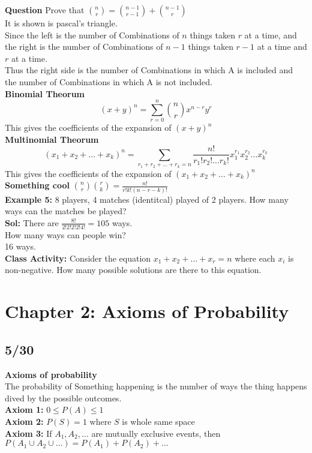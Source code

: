 \documentclass{article}
\begin{document}
\textbf{Question} Prove that $\binom{n}{r} = \binom{n-1}{r-1} + \binom{n-1}{r}$\\
It is shown is pascal's triangle.\\
Since the left is the number of Combinations of $n$ things taken $r$ at a time, and the right is the number of Combinations of $n-1$ things taken $r-1$ at a time and $r$ at a time.\\ 
Thus the right side is the number of Combinations in which A is included and the number of Combinations in which A is not included.\\

\textbf{Binomial Theorum}\\
$$ (x+y)^n = \sum_{r=0}^{n} \binom{n}{r} x^{n-r}y^r$$
This gives the coefficients of the expansion of $(x+y)^n$\\

\textbf{Multinomial Theorum}\\
$$ (x_1 + x_2 + \ldots + x_k)^n = \sum_{r_1 + r_2 + \ldots + r_k = n} \frac{n!}{r_1!r_2! \ldots r_k!} x_1^{r_1}x_2^{r_2} \ldots x_k^{r_k}$$
This gives the coefficients of the expansion of $(x_1 + x_2 + \ldots + x_k)^n$\\

\textbf{Something cool} $\binom{n}{r} \binom{r}{k} = \frac{n!}{r!k!(n-r-k)!}$\\

\textbf{Example 5:} 8 players, 4 matches (identitcal) played of 2 players. How many ways can the matches be played?\\
\textbf{Sol:} There are $\frac{8!}{2!2!2!2!4!} = 105$ ways.\\
How many ways can people win?\\
16 ways.\\

\textbf{Class Activity:} Consider the equation $x_1 + x_2 + \ldots + x_r = n$ where each $x_i$ is non-negative. How many possible solutions are there to this equation. 

\section{Chapter 2: Axioms of Probability}
\subsection*{5/30}
\textbf{Axioms of probability}\\
The probability of Something happening is the number of ways the thing happens dived by the possible outcomes.\\
\textbf{Axiom 1:} $0 \leq P(A) \leq 1$\\
\textbf{Axiom 2:} $P(S) = 1$ where $S$ is whole same space\\
\textbf{Axiom 3:} If $A_1, A_2, \ldots$ are mutually exclusive events, then $P(A_1 \cup A_2 \cup \ldots) = P(A_1) + P(A_2) + \ldots$\\
\end{document}
